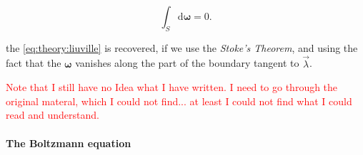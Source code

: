 \begin{equation}
\int_S\text{d}\boldsymbol{\omega} = 0.
\end{equation}

the \ref{eq:theory:liuville} is recovered, if we use the \textit{Stoke’s Theorem}, and using the fact that the $\boldsymbol{\omega}$ vanishes along the part of the boundary tangent to $\vec{\lambda}$.

\textcolor{red}{Note that I still have no Idea what I have written. I need to go through the original materal, which I could not find... at least I could not find what I could read and understand. }


\paragraph{The Boltzmann equation}


